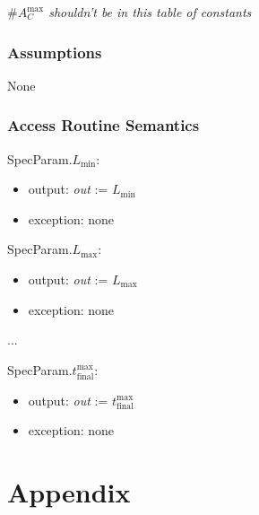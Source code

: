 \documentclass[12pt]{article}
\begin{document}
\#\textit{$A_C^{\text{max}}$ shouldn't be in this table of constants}

\subsubsection{Assumptions}

None

\subsubsection{Access Routine Semantics}

\noindent SpecParam.$L_\text{min}$:
\begin{itemize}
\item output: \textit{out} := $L_\text{min}$
\item exception: none
\end{itemize}

\noindent SpecParam.$L_\text{max}$:
\begin{itemize}
\item output: \textit{out} := $L_\text{max}$
\item exception: none
\end{itemize}

...
~\newline

\noindent SpecParam.$t_{\text{final}}^{\text{max}}$:
\begin{itemize}
\item output: \textit{out} := $t_{\text{final}}^{\text{max}}$
\item exception: none
\end{itemize}

\newpage

\section{Appendix} \label{Appendix}

\renewcommand{\arraystretch}{1.2}
\end{document}
